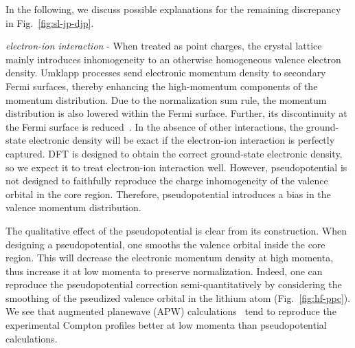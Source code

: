 \documentclass[aps,prb,showpacs,preprintnumbers,amsmath,amssymb,superscriptaddress,twocolumn]{revtex4-1}
\begin{document}
In the following, we discuss possible explanations for the remaining discrepancy in Fig.~\ref{fig:sl-jp-djp}. %

\emph{electron-ion interaction} - When treated as point charges, the crystal lattice mainly introduces inhomogeneity to an otherwise homogeneous valence electron density. Umklapp processes send electronic momentum density to secondary Fermi surfaces, thereby enhancing the high-momentum components of the momentum distribution. Due to the normalization sum rule, the momentum distribution is also lowered within the Fermi surface. Further, its discontinuity at the Fermi surface is reduced~\cite{Eisenberger1972}.
In the absence of other interactions, the ground-state electronic density will be exact if the electron-ion interaction is perfectly captured. DFT is designed to obtain the correct ground-state electronic density, so we expect it to treat electron-ion interaction well. However, pseudopotential is not designed to faithfully reproduce the charge inhomogeneity of the valence orbital in the core region. Therefore, pseudopotential introduces a bias in the valence momentum distribution.

The qualitative effect of the pseudopotential is clear from its construction. When designing a pseudopotential, one smooths the valence orbital inside the core region. This will decrease the electronic momentum density at high momenta, thus increase it at low momenta to preserve normalization. Indeed, one can reproduce the pseudopotential correction semi-quantitatively by considering the smoothing of the pseudized valence orbital in the lithium atom (Fig.~\ref{fig:hf-ppc}). We see that augmented planewave (APW) calculations~\cite{Baruah1999,Bross2004,Bross2005,Bross2012} tend to reproduce the experimental Compton profiles better at low momenta than pseudopotential calculations.
\end{document}
